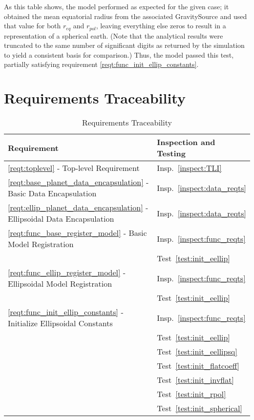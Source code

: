 \begin{description}
As this table shows, the model performed as expected for the given case; it
obtained the mean equatorial radius from the associated GravitySource and used
that value for both $r_{eq}$ and $r_{pol}$, leaving everything else zeros to
result in a representation of a spherical earth. (Note that the analytical
results were truncated to the same number of significant digits as returned by
the simulation to yield a consistent basis for comparison.) Thus, the model
passed this test, partially satisfying requirement
\mbox{\ref{reqt:func_init_ellip_constants}}.
\end{description}

\newpage
\section{Requirements Traceability}\label{sec:traceability}

\begin{longtable}[c]{||p{3in}|p{3in}|}
\caption{Requirements Traceability} \\[6pt]
\hline
{\bf Requirement} & {\bf Inspection and Testing} \\ 
\hline \hline
\endhead

\ref{reqt:toplevel} - Top-level Requirement &
  Insp.~\ref{inspect:TLI} \\ 
  \hline

\ref{reqt:base_planet_data_encapsulation} - Basic Data Encapsulation &
   Insp.~\ref{inspect:data_reqts} \\
\hline

\ref{reqt:ellip_planet_data_encapsulation} - Ellipsoidal Data Encapsulation &
   Insp.~\ref{inspect:data_reqts} \\
\hline

\ref{reqt:func_base_register_model} - Basic Model Registration &
   Insp.~\ref{inspect:func_reqts} \\
   &Test~\ref{test:init_eellip} \\ 
\hline

\ref{reqt:func_ellip_register_model} - Ellipsoidal Model Registration &
   Insp.~\ref{inspect:func_reqts} \\
   &Test~\ref{test:init_eellip} \\ 
\hline

\ref{reqt:func_init_ellip_constants} - Initialize Ellipsoidal Constants &
   Insp.~\ref{inspect:func_reqts} \\
   &Test~\ref{test:init_eellip} \\ 
   &Test~\ref{test:init_eellipsq} \\ 
   &Test~\ref{test:init_flatcoeff} \\ 
   &Test~\ref{test:init_invflat} \\ 
   &Test~\ref{test:init_rpol} \\ 
   &Test~\ref{test:init_spherical} \\ 
\hline

\end{longtable}

\newpage



